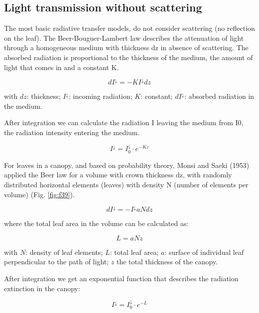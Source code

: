\documentclass[12pt,oneside]{book}
\begin{document}
\subsection{Light transmission without
scattering}\label{light-transmission-without-scattering}

The most basic radiative transfer models, do not consider scattering (no
reflection on the leaf). The Beer-Bouguer-Lambert law describes the
attenuation of light through a homogeneous medium with thickness dz in
absence of scattering. The absorbed radiation is proportional to the
thickness of the medium, the amount of light that comes in and a
constant K.

\[
dI^{\downarrow} = -KI^\downarrow dz
\]

with \(dz\): thickness; \(I^\downarrow\): incoming radiation; \(K\):
constant; \(dI^\downarrow\): absorbed radiation in the medium.

After integration we can calculate the radiation I leaving the medium
from I0, the radiation intensity entering the medium.

\[
I^{\downarrow} = I^{\downarrow}_0\cdot e^{-Kz}
\]

For leaves in a canopy, and based on probability theory, Monsi and Saeki
(1953) applied the Beer law for a volume with crown thickness dz, with
randomly distributed horizontal elements (leaves) with density N (number
of elements per volume) (Fig. \ref{fig:f39}).

\[
dI^{\downarrow} = - I^{\downarrow} a N dz
\]

where the total leaf area in the volume can be calculated as:

\[
L = aNz
\]

with \(N\): density of leaf elements; \(L\): total leaf area; \(a\):
surface of individual leaf perpendicular to the path of light; \(z\) the
total thickness of the canopy.

After integration we get an exponential function that describes the
radiation extinction in the canopy:

\[
I^{\downarrow} = I^{\downarrow}_0\cdot e^{-L}
\]
\end{document}

